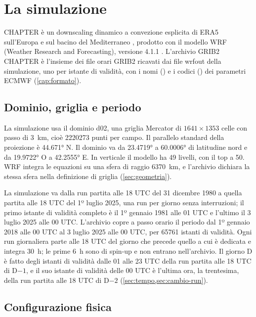 \chapter{La simulazione}
\label{cap:simulazione}

CHAPTER è un downscaling dinamico a convezione esplicita di ERA5 sull'Europa e sul bacino del
Mediterraneo \parencite{bernini2025}, prodotto con il modello WRF (Weather Research and
Forecasting), versione 4.1.1 \parencite{wrf411}. L'archivio GRIB2 CHAPTER è l'insieme dei file
orari GRIB2 ricavati dai file wrfout della simulazione, uno per istante di validità, con i nomi
() e i codici () dei parametri ECMWF (\cref{cap:formato}).

\section{Dominio, griglia e periodo}
\label{sec:dominio}

La simulazione usa il dominio d02, una griglia Mercator di $\num{1641} \times \num{1353}$ celle
con passo di \SI{3}{km}, cioè \num{2220273} punti per campo. Il parallelo standard della
proiezione è \ang{44.671} N. Il dominio va da \ang{23.4719} a \ang{60.0006} di latitudine nord e
da \ang{19.9722} O a \ang{42.2555} E. In verticale il modello ha 49 livelli, con il top a
\SI{50}{\hPa}. WRF integra le equazioni su una sfera di raggio \SI{6370}{km}, e l'archivio dichiara
la stessa sfera nella definizione di griglia (\cref{sec:geometria}).

La simulazione va dalla run partita alle 18 UTC del 31 dicembre 1980 a quella partita alle 18 UTC
del 1º luglio 2025, una run per giorno senza interruzioni; il primo istante di validità completo è
il 1º gennaio 1981 alle 01 UTC e l'ultimo il 3 luglio 2025 alle 00 UTC. L'archivio copre a passo
orario il periodo dal 1º gennaio 2018 alle 00 UTC al 3 luglio 2025 alle 00 UTC, per \num{65761}
istanti di validità. Ogni run giornaliera parte alle 18 UTC del giorno che precede quello a cui è dedicata
e integra \SI{30}{h}; le prime \SI{6}{h} sono di spin-up e non entrano nell'archivio. Il giorno D è
fatto degli istanti di validità dalle 01 alle 23 UTC della run partita alle 18 UTC di D$-1$, e il suo
istante di validità delle 00 UTC è l'ultima ora, la trentesima, della run partita alle 18 UTC di
D$-2$ (\cref{sec:tempo,sec:cambio-run}).

\section{Configurazione fisica}
\label{sec:configurazione}

